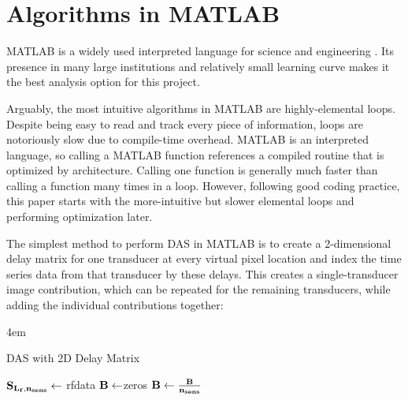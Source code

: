\section{Algorithms in MATLAB}
\label{chapter3:matlab_code}

    MATLAB is a widely used interpreted language for science and engineering \cite{BriefHistoryMATLAB}. Its presence in many large institutions and relatively small learning curve makes it the best analysis option for this project.

    Arguably, the most intuitive algorithms in MATLAB are highly-elemental loops. Despite being easy to read and track every piece of information, loops are notoriously slow due to compile-time overhead. MATLAB is an interpreted language, so calling a MATLAB function references a compiled routine that is optimized by architecture. Calling one function is generally much faster than calling a function many times in a loop. However, following good coding practice, this paper starts with the more-intuitive but slower elemental loops and performing optimization later.

    The simplest method to perform DAS in MATLAB is to create a 2-dimensional delay matrix for one transducer at every virtual pixel location and index the time series data from that transducer by these delays. This creates a single-transducer image contribution, which can be repeated for the remaining transducers, while adding the individual contributions together:
    \\

    \begin{algorithm} [H]
    \parindent4em
    \normalem
    \caption{DAS with 2D Delay Matrix}\label{algo:basic_das}
        $\bf{S}_{L_f,n_{sens}} \gets$ rfdata\;
        $\bf{B} \gets $zeros\;
        $\bf{B} \gets \frac{\bf{B}}{n_{sens}}$\;
    \end{algorithm}

